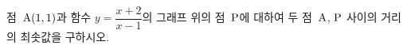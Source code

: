 점~$\mathrm{A}(1{,}\mkern3mu\mathopen{}1)$과 함수 $y=\dfrac{x+2}{x-1}$의 그래프 위의 점~$\mathrm{P}$에 대하여 두 점~$\mathrm{A}$, $\mathrm{P}$ 사이의 거리의 최솟값을 구하시오.

